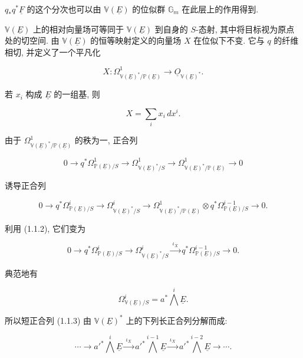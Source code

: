 $q_*q^*\underline F$ 的这个分次也可以由 $\mathbb V(\underline E)$ 的位似群 $\mathbb G_m$ 在此层上的作用得到.

$\mathbb V(\underline E)$ 上的相对向量场可等同于 $\mathbb V(\underline E)$ 到自身的 $S$-态射, 其中将目标视为原点处的切空间. 由 $\mathbb V(\underline E)$ 的恒等映射定义的向量场 $X$ 在位似下不变. 它与 $q$ 的纤维相切, 并定义了一个平凡化

\begin{equation}\tag{1.1.2}
X:\Omega^1_{\mathbb V(\underline E)^*/\mathbb P(\underline E)}
\longrightarrow\underline O_{\mathbb V(\underline E)^*}.
\end{equation}

若 $x_i$ 构成 $\underline E$ 的一组基, 则

\begin{equation*}
X=\sum_i x_i\,dx^i.
\end{equation*}

由于 $\Omega^1_{\mathbb V(\underline E)^*/\mathbb P(\underline E)}$ 的秩为一, 正合列

\begin{equation*}
0\longrightarrow q^*\Omega^1_{\mathbb P(\underline E)/S}
\longrightarrow\Omega^1_{\mathbb V(\underline E)^*/S}
\longrightarrow
\Omega^1_{\mathbb V(\underline E)^*/\mathbb P(\underline E)}
\longrightarrow0
\end{equation*}

诱导正合列

\begin{equation*}
0\longrightarrow q^*\Omega^i_{\mathbb P(\underline E)/S}
\longrightarrow\Omega^i_{\mathbb V(\underline E)^*/S}
\longrightarrow
\Omega^1_{\mathbb V(\underline E)^*/\mathbb P(\underline E)}
\otimes q^*\Omega^{i-1}_{\mathbb P(\underline E)/S}
\longrightarrow0.
\end{equation*}

利用 (1.1.2), 它们变为

\begin{equation}\tag{1.1.3}
0\longrightarrow q^*\Omega^i_{\mathbb P(\underline E)/S}
\longrightarrow\Omega^i_{\mathbb V(\underline E)^*/S}
\xrightarrow{\ \iota_X\ }
q^*\Omega^{i-1}_{\mathbb P(\underline E)/S}
\longrightarrow0.
\end{equation}

典范地有

\begin{equation}\tag{1.1.4}
\Omega^i_{\mathbb V(\underline E)/S}
=a^*\bigwedge^i\underline E.
\end{equation}

所以短正合列 (1.1.3) 由 $\mathbb V(\underline E)^*$ 上的下列长正合列分解而成:

\begin{equation}\tag{1.1.5}
\cdots\longrightarrow {a'}^*\bigwedge^i\underline E
\xrightarrow{\ \iota_X\ }
{a'}^*\bigwedge^{i-1}\underline E
\xrightarrow{\ \iota_X\ }
{a'}^*\bigwedge^{i-2}\underline E\longrightarrow\cdots.
\end{equation}

